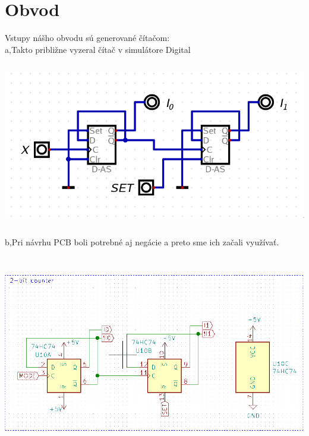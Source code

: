 \newpage
\section*{Obvod}

Vstupy nášho obvodu sú generované čítačom:\\
a,Takto približne vyzeral čítač v simulátore Digital\\
\begin{center}
    \includegraphics[width=16.2cm, height=7.2cm]{images/counter_dig.png}
\end{center}
b,Pri návrhu PCB boli potrebné aj negácie a preto sme ich začali využívať.
\begin{center}
    \includegraphics[width=16.2cm, height=8.5cm]{images/counter_kic.png}	
\end{center}

